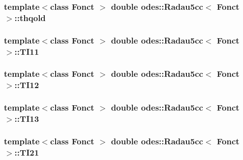 \subsubsection[{thqold}]{\setlength{\rightskip}{0pt plus 5cm}template$<$class Fonct $>$ double {\bf odes\+::\+Radau5cc}$<$ Fonct $>$\+::thqold\hspace{0.3cm}{\ttfamily [private]}}\label{classodes_1_1Radau5cc_adda256e4a50fe0b527b9a389ba06a9c4}
\hypertarget{classodes_1_1Radau5cc_a50cc7d8eee62bccf6069a4c1f43d019b}{}
\subsubsection[{T\+I11}]{\setlength{\rightskip}{0pt plus 5cm}template$<$class Fonct $>$ double {\bf odes\+::\+Radau5cc}$<$ Fonct $>$\+::T\+I11\hspace{0.3cm}{\ttfamily [private]}}\label{classodes_1_1Radau5cc_a50cc7d8eee62bccf6069a4c1f43d019b}
\hypertarget{classodes_1_1Radau5cc_aaed25bf9d94e2cbbbeed75c093c0406f}{}
\subsubsection[{T\+I12}]{\setlength{\rightskip}{0pt plus 5cm}template$<$class Fonct $>$ double {\bf odes\+::\+Radau5cc}$<$ Fonct $>$\+::T\+I12\hspace{0.3cm}{\ttfamily [private]}}\label{classodes_1_1Radau5cc_aaed25bf9d94e2cbbbeed75c093c0406f}
\hypertarget{classodes_1_1Radau5cc_a6da247a0623462bb1d61e5c97d67a39f}{}
\subsubsection[{T\+I13}]{\setlength{\rightskip}{0pt plus 5cm}template$<$class Fonct $>$ double {\bf odes\+::\+Radau5cc}$<$ Fonct $>$\+::T\+I13\hspace{0.3cm}{\ttfamily [private]}}\label{classodes_1_1Radau5cc_a6da247a0623462bb1d61e5c97d67a39f}
\hypertarget{classodes_1_1Radau5cc_a14b80d1886a7562f3a72ce7acd738272}{}
\subsubsection[{T\+I21}]{\setlength{\rightskip}{0pt plus 5cm}template$<$class Fonct $>$ double {\bf odes\+::\+Radau5cc}$<$ Fonct $>$\+::T\+I21\hspace{0.3cm}{\ttfamily [private]}}\label{classodes_1_1Radau5cc_a14b80d1886a7562f3a72ce7acd738272}
\hypertarget{classodes_1_1Radau5cc_a77584ef2a5a6cccef4fe531e95c800d7}{}
